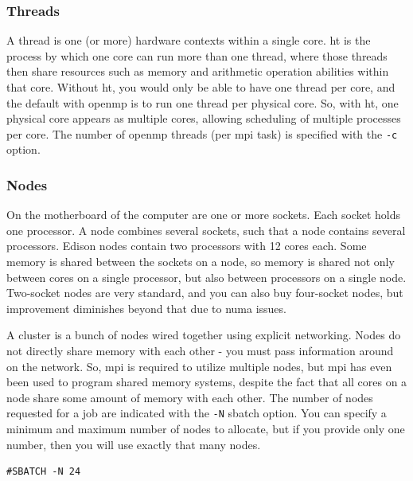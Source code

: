 \documentclass[10pt]{article}
\begin{document}
\begin{flushleft}
\subsubsection{Threads}
A thread is one (or more) hardware contexts within a single core. \gls{ht} is the process by which one core can run more than one thread, where those threads then share resources such as memory and arithmetic operation abilities within that core. Without \gls{ht}, you would only be able to have one thread per core, and the default with \gls{openmp} is to run one thread per physical core. So, with \gls{ht}, one physical core appears as multiple cores, allowing scheduling of multiple processes per core. The number of \gls{openmp} threads (per \gls{mpi} task) is specified with the {\tt -c} option.

\subsubsection{Nodes}
On the motherboard of the computer are one or more sockets. Each socket holds one processor. A node combines several sockets, such that a node contains several processors. Edison nodes contain two processors with 12 cores each. Some memory is shared between the sockets on a node, so memory is shared not only between cores on a single processor, but also between processors on a single node. Two-socket nodes are very standard, and you can also buy four-socket nodes, but improvement diminishes beyond that due to \gls{numa} issues. 

A cluster is a bunch of nodes wired together using explicit networking. Nodes do not directly share memory with each other - you must pass information around on the network. So, \gls{mpi} is required to utilize multiple nodes, but \gls{mpi} has even been used to program shared memory systems, despite the fact that all cores on a node share some amount of memory with each other. The number of nodes requested for a job are indicated with the {\tt -N} sbatch option. You can specify a minimum and maximum number of nodes to allocate, but if you provide only one number, then you will use exactly that many nodes.

\begin{lstlisting}
#SBATCH -N 24
\end{lstlisting}


\end{flushleft}
\end{document}
